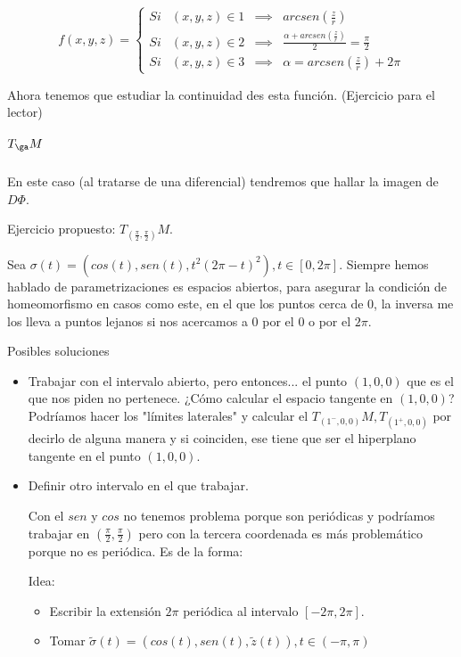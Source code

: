\[f(x,y,z) =\left\{ \begin{matrix}
Si & (x,y,z) \in 1 &\implies &arcsen\left(\frac{z}{r}\right)\\
Si & (x,y,z) \in 2 &\implies &\displaystyle\frac{\alpha + arcsen\left(\frac{z}{r}\right)}{2} = \frac{\pi}{2}\\
Si & (x,y,z) \in 3 &\implies & \alpha = arcsen\left(\frac{z}{r}\right) + 2\pi
\end{matrix}\right.
\]

Ahora tenemos que estudiar la continuidad des esta función. (Ejercicio para el lector)


\subparagraph{$T_{\ga}M$}

En este caso (al tratarse de una diferencial) tendremos que hallar la imagen de $D\Phi$.

Ejercicio propuesto: $T_{\left(\frac{\pi}{2},\frac{\pi}{2}\right)}M$.


\begin{problem}[4.4]
Sea $\sigma(t) = \left( cos(t),sen(t),t^2(2\pi - t)^2\right), t \in [0,2\pi]$.
\solution
Siempre hemos hablado de parametrizaciones es espacios abiertos, para asegurar la condición de homeomorfismo en casos como este, en el que los puntos cerca de $0$, la inversa me los lleva a puntos lejanos si nos acercamos a $0$ por el $0$ o por el $2\pi$.

Posibles soluciones
\begin{itemize}
\item  Trabajar con el intervalo abierto, pero entonces... el punto $(1,0,0)$ que es el que nos piden no pertenece. ¿Cómo calcular el espacio tangente en $(1,0,0)$? Podríamos hacer los "límites laterales" y calcular el $T_{(1^{-},0,0)}M, T_{(1^{+},0,0)}$ por decirlo de alguna manera y si coinciden, ese tiene que ser el hiperplano tangente en el punto $(1,0,0)$.

\item Definir otro intervalo en el que trabajar. 

Con el $sen$ y $cos$ no tenemos problema porque son periódicas y podríamos trabajar en $\left(\frac{\pi}{2},\frac{\pi}{2}\right)$ pero con la tercera coordenada es más problemático porque no es periódica. Es de la forma:


Idea: 
\begin{itemize}
\item Escribir la extensión $2\pi$ periódica al intervalo $[-2\pi,2\pi]$.
\item Tomar $\tilde{\sigma}(t) = (cos(t),sen(t),\tilde{z}(t)), t\in (-\pi,\pi)$
\end{itemize}
\end{itemize}

\end{problem}
